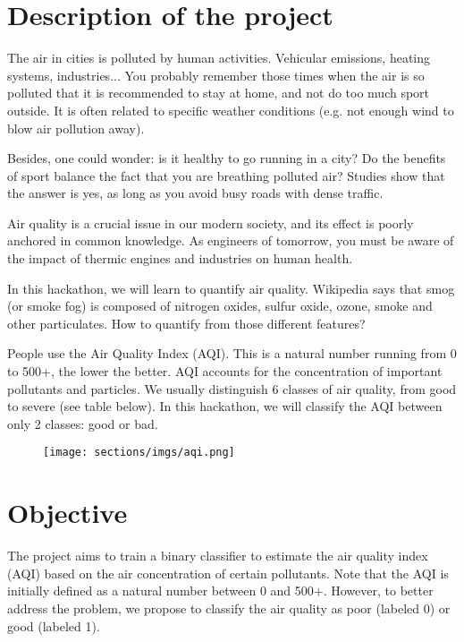 \section*{Description of the project}
The air in cities is polluted by human activities. Vehicular emissions, heating systems, industries... You probably remember those times when the air is so polluted that it is recommended to stay at home, and not do too much sport outside. It is often related to specific weather conditions (e.g. not enough wind to blow air pollution away).

\bigskip

Besides, one could wonder: is it healthy to go running in a city? Do the benefits of sport balance the fact that you are breathing polluted air? Studies show that the answer is yes, as long as you avoid busy roads with dense traffic.

\bigskip

Air quality is a crucial issue in our modern society, and its effect is poorly anchored in common knowledge. As engineers of tomorrow, you must be aware of the impact of thermic engines and industries on human health.

\bigskip

In this hackathon, we will learn to quantify air quality. Wikipedia says that smog (or smoke fog) is composed of nitrogen oxides, sulfur oxide, ozone, smoke and other particulates. How to quantify from those different features?

\bigskip

People use the Air Quality Index (AQI). This is a natural number running from 0 to 500+, the lower the better. AQI accounts for the concentration of important pollutants and particles. We usually distinguish 6 classes of air quality, from good to severe (see table below). In this hackathon, we will classify the AQI between only 2 classes: good or bad.

\begin{figure}[h]
	\centering
	\texttt{[image: sections/imgs/aqi.png]}
\end{figure}

\section*{Objective}
The project aims to train a binary classifier to estimate the air quality index (AQI) based on the air concentration of certain pollutants. Note that the AQI is initially defined as a natural number between 0 and 500+. However, to better address the problem, we propose to classify the air quality as poor (labeled 0) or good (labeled 1).   


